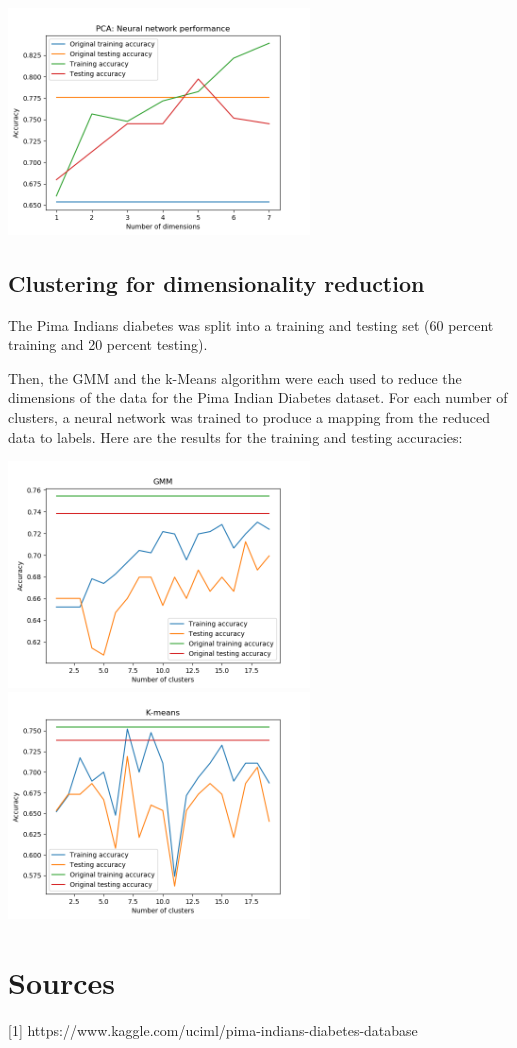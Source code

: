 \documentclass[11pt]{article}
\begin{document}
            \includegraphics[width=8cm]{../pima/nn_pca/nn_pca.png}

            \subsection{Clustering for dimensionality reduction}

            The Pima Indians diabetes was split into a training and testing set (60
            percent training and 20 percent testing).

            Then, the GMM and the k-Means algorithm were each used to reduce the dimensions of
            the data for the Pima Indian Diabetes dataset. For each number of clusters,
            a neural network was trained to produce a mapping from the reduced data
            to labels. Here are the results for the training and testing
            accuracies:

            \includegraphics[width=8cm]{../pima/clustering3/gmm_acc.png}
            \includegraphics[width=8cm]{../pima/clustering3/km_acc.png}



        \section{Sources}

        [1] https://www.kaggle.com/uciml/pima-indians-diabetes-database



    
\end{document}
